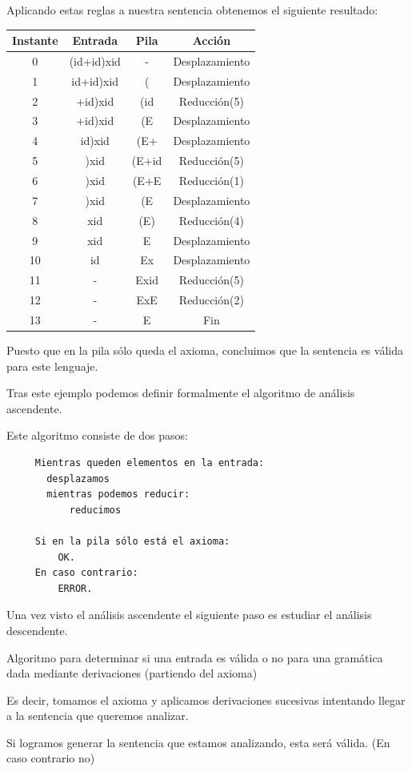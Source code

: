 \documentclass{apuntes}
\begin{document}
\begin{example}
Aplicando estas reglas a nuestra sentencia obtenemos el siguiente resultado:
\begin{center}
\begin{tabular}{| c | c | c | c |}
\hline
Instante & Entrada & Pila & Acción \\
\hline
0 & (id+id)xid & - & Desplazamiento \\
\hline
1 & id+id)xid & ( & Desplazamiento \\
\hline
2 & +id)xid & (id & Reducción(5) \\
\hline
3 & +id)xid & (E & Desplazamiento \\
\hline
4 & id)xid & (E+ & Desplazamiento \\
\hline
5 & )xid & (E+id & Reducción(5)\\
\hline
6 & )xid & (E+E & Reducción(1) \\
\hline
7 & )xid & (E & Desplazamiento \\
\hline
8 & xid & (E) & Reducción(4) \\
\hline
9 & xid & E & Desplazamiento \\
\hline
10 & id & Ex & Desplazamiento \\
\hline
11 & - & Exid & Reducción(5) \\
\hline
12 & - & ExE & Reducción(2) \\
\hline
13 & - & E & Fin \\
\hline
\end{tabular}
\end{center}
Puesto que en la pila sólo queda el axioma, concluimos que la sentencia es válida para este lenguaje.
\end{example}

Tras este ejemplo podemos definir formalmente el algoritmo de análisis ascendente.

\begin{defn}
Este algoritmo consiste de dos pasos:
\begin{verbatim}
     Mientras queden elementos en la entrada:
       desplazamos
       mientras podemos reducir:
           reducimos

     Si en la pila sólo está el axioma:
         OK.
     En caso contrario:
         ERROR.
\end{verbatim}
\end{defn}

Una vez visto el análisis ascendente el siguiente paso es estudiar el análisis descendente.

\begin{defn}
Algoritmo para determinar si una entrada es válida o no para una gramática dada mediante derivaciones (partiendo del axioma)

Es decir, tomamos el axioma y aplicamos derivaciones sucesivas intentando llegar a la sentencia que queremos analizar.

Si logramos generar la sentencia que estamos analizando, esta será válida. (En caso contrario no)
\end{defn}
\end{document}
